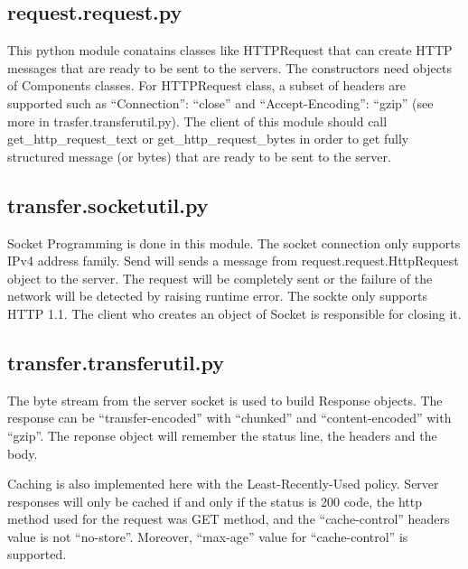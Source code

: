 \documentclass[11pt]{article}
\begin{document}
\subsection{request.request.py}

This python module conatains classes like HTTPRequest that can create HTTP messages that are ready to be sent to the servers.
The constructors need objects of Components classes. For {\color{blue}HTTPRequest} class, a subset of headers are supported such as ``Connection'': ``close'' and 
``Accept-Encoding'': ``gzip'' (see more in trasfer.transferutil.py). The client of this module should call {\color{blue}get\_http\_request\_text} or {\color{blue}get\_http\_request\_bytes} in order to 
get fully structured message (or bytes) that are ready to be sent to the server. 

\subsection{transfer.socketutil.py}

Socket Programming is done in this module. The socket connection only supports IPv4 address family. {\color{blue}Send} will sends a message from {\color{blue}request.request.HttpRequest} object to the server. The request will be completely sent or the failure of the network will be detected by raising 
runtime error. The sockte only supports HTTP 1.1. The client who creates an object of Socket is responsible for closing it.

\subsection{transfer.transferutil.py}
The byte stream from the server socket is used to build Response objects. The response can be ``transfer-encoded'' with ``chunked'' and ``content-encoded'' with ``gzip''.
The reponse object will remember the status line, the headers and the body.

Caching is also implemented here with the Least-Recently-Used policy. Server responses will only be cached if and only if the status is 200 code, the http
method used for the request was GET method, and the ``cache-control'' headers value is not ``no-store''. Moreover, ``max-age'' value for ``cache-control'' is supported.
\end{document}
